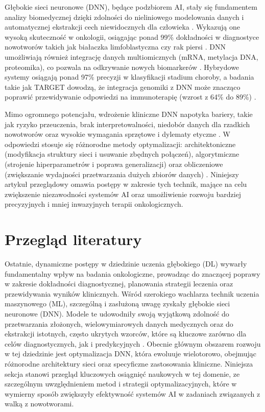 Głębokie sieci neuronowe (DNN), będące podzbiorem AI, stały się fundamentem analizy biomedycznej dzięki zdolności do nieliniowego modelowania danych i automatycznej ekstrakcji cech niewidocznych dla człowieka \cite{FF1, WW1, DD2, YY1}. Wykazują one wysoką skuteczność w onkologii, osiągając ponad 99\% dokładności w diagnostyce nowotworów takich jak białaczka limfoblastyczna czy rak piersi \cite{II1, PP1}. DNN umożliwiają również integrację danych multiomicznych (mRNA, metylacja DNA, proteomika), co pozwala na odkrywanie nowych biomarkerów \cite{LL1, KK1, RR1}. Hybrydowe systemy osiągają ponad 97\% precyzji w klasyfikacji stadium choroby, a badania takie jak TARGET dowodzą, że integracja genomiki z DNN może znacząco poprawić przewidywanie odpowiedzi na immunoterapię (wzrost z 64\% do 89\%) \cite{SS1, TT1, BB1}.

Mimo ogromnego potencjału, wdrożenie kliniczne DNN napotyka bariery, takie jak ryzyko przeuczenia, brak interpretowalności, niedobór danych dla rzadkich nowotworów oraz wysokie wymagania sprzętowe i dylematy etyczne \cite{AA2, RR1, CC1, GG2, ZZ1}. W odpowiedzi stosuje się różnorodne metody optymalizacji: architektoniczne (modyfikacja struktury sieci i usuwanie zbędnych połączeń), algorytmiczne (strojenie hiperparametrów i poprawa generalizacji) oraz obliczeniowe (zwiększanie wydajności przetwarzania dużych zbiorów danych) \cite{AA1, DD2, BB1, GG1, HH1, FF2}. Niniejszy artykuł przeglądowy omawia postępy w zakresie tych technik, mające na celu zwiększenie niezawodności systemów AI oraz umożliwienie rozwoju bardziej precyzyjnych i mniej inwazyjnych terapii onkologicznych.


\section{Przegląd literatury}
Ostatnie, dynamiczne postępy w dziedzinie uczenia głębokiego (DL) wywarły fundamentalny wpływ na badania onkologiczne, prowadząc do znaczącej poprawy w zakresie dokładności diagnostycznej, planowania strategii leczenia oraz przewidywania wyników klinicznych. Wśród szerokiego wachlarza technik uczenia maszynowego (ML), szczególną i zasłużoną uwagę zyskały głębokie sieci neuronowe (DNN). Modele te udowodniły swoją wyjątkową zdolność do przetwarzania złożonych, wielowymiarowych danych medycznych oraz do ekstrakcji istotnych, często ukrytych wzorców, które są kluczowe zarówno dla celów diagnostycznych, jak i predykcyjnych \cite{HH1, LL1}. Obecnie głównym obszarem rozwoju w tej dziedzinie jest optymalizacja DNN, która ewoluuje wielotorowo, obejmując różnorodne architektury sieci oraz specyficzne zastosowania kliniczne. Niniejsza sekcja stanowi przegląd kluczowych osiągnięć naukowych w tej domenie, ze szczególnym uwzględnieniem metod i strategii optymalizacyjnych, które w wymierny sposób zwiększyły efektywność systemów AI w zadaniach związanych z walką z nowotworami.
 
